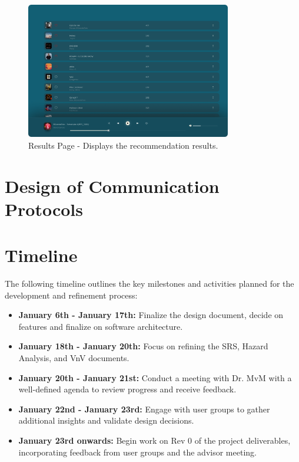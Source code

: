\documentclass[12pt, titlepage]{article}
\begin{document}
\begin{figure}[h!]
  \centering
  \includegraphics[width=0.8\textwidth]{UI_Images/Results_Page.png}
  \caption{Results Page - Displays the recommendation results.}
  \label{fig:results_page}
\end{figure}



\section{Design of Communication Protocols}


\section{Timeline}

The following timeline outlines the key milestones and activities planned for the development and refinement process:

\begin{itemize}
    \item \textbf{January 6th - January 17th:} Finalize the design document, decide on features and finalize on software architecture.
    \item \textbf{January 18th - January 20th:} Focus on refining the SRS, Hazard Analysis, and VnV documents.
    \item \textbf{January 20th - January 21st:} Conduct a meeting with Dr. MvM with a well-defined agenda to review progress and receive feedback.
    \item \textbf{January 22nd - January 23rd:} Engage with user groups to gather additional insights and validate design decisions.
    \item \textbf{January 23rd onwards:} Begin work on Rev 0 of the project deliverables, incorporating feedback from user groups and the advisor meeting.
\end{itemize}
\end{document}
